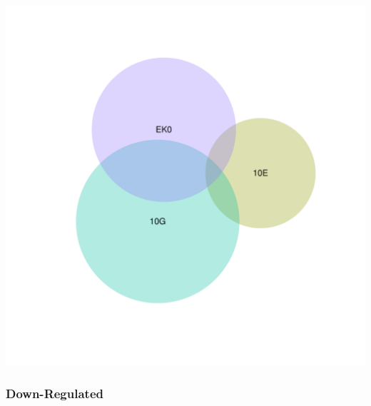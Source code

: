 \documentclass{article}\usepackage[]{graphicx}\usepackage[]{color}
\newenvironment{knitrout}{}{} %
\begin{document}
\begin{knitrout}
\color{fgcolor}

{\centering \includegraphics[width=1\linewidth,height=.4\textheight]{figure/minimal-venn_t3_3fc_up_euler-1} 

}



\end{knitrout}
\clearpage
\subsubsection{Down-Regulated}
\end{document}
